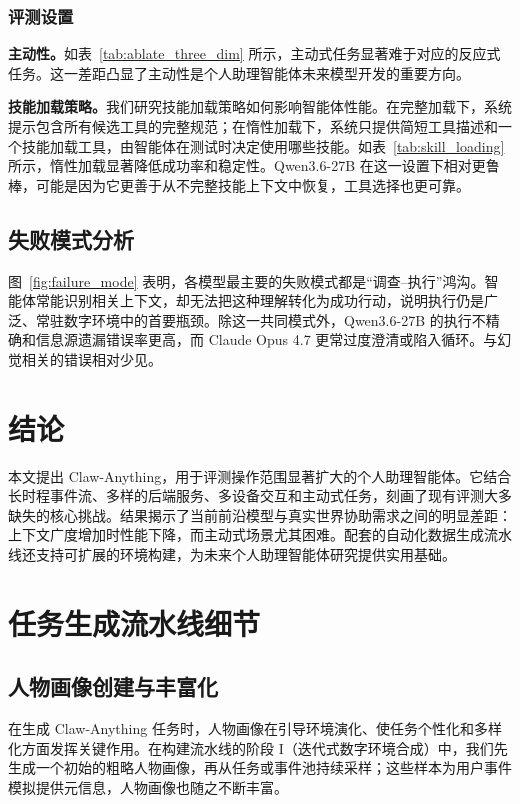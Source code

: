 \documentclass[10pt]{article}
\begin{document}
\subsubsection{评测设置}
\label{sec:ab_eval_setting}

\textbf{主动性。}如表~\ref{tab:ablate_three_dim} 所示，主动式任务显著难于对应的反应式任务。这一差距凸显了主动性是个人助理智能体未来模型开发的重要方向。

\textbf{技能加载策略。}我们研究技能加载策略如何影响智能体性能。在完整加载下，系统提示包含所有候选工具的完整规范；在惰性加载下，系统只提供简短工具描述和一个技能加载工具，由智能体在测试时决定使用哪些技能。如表~\ref{tab:skill_loading} 所示，惰性加载显著降低成功率和稳定性。Qwen3.6-27B 在这一设置下相对更鲁棒，可能是因为它更善于从不完整技能上下文中恢复，工具选择也更可靠。

\subsection{失败模式分析}

图~\ref{fig:failure_mode} 表明，各模型最主要的失败模式都是“调查--执行”鸿沟。智能体常能识别相关上下文，却无法把这种理解转化为成功行动，说明执行仍是广泛、常驻数字环境中的首要瓶颈。除这一共同模式外，Qwen3.6-27B 的执行不精确和信息源遗漏错误率更高，而 Claude Opus 4.7 更常过度澄清或陷入循环。与幻觉相关的错误相对少见。

\section{结论}
\label{sec:conclusion}

本文提出 Claw-Anything，用于评测操作范围显著扩大的个人助理智能体。它结合长时程事件流、多样的后端服务、多设备交互和主动式任务，刻画了现有评测大多缺失的核心挑战。结果揭示了当前前沿模型与真实世界协助需求之间的明显差距：上下文广度增加时性能下降，而主动式场景尤其困难。配套的自动化数据生成流水线还支持可扩展的环境构建，为未来个人助理智能体研究提供实用基础。

\appendix

\section{任务生成流水线细节}

\subsection{人物画像创建与丰富化}

在生成 Claw-Anything 任务时，人物画像在引导环境演化、使任务个性化和多样化方面发挥关键作用。在构建流水线的阶段 I（迭代式数字环境合成）中，我们先生成一个初始的粗略人物画像，再从任务或事件池持续采样；这些样本为用户事件模拟提供元信息，人物画像也随之不断丰富。
\end{document}

